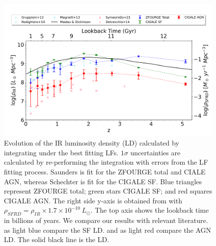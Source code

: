 \begin{figure}
    \centering
    \includegraphics[width=\textwidth]{Figures/SFRD.png}
    \caption{Evolution of the IR luminosity density (LD) calculated by integrating under the best fitting LFs. $1\sigma$ uncertainties are calculated by re-performing the integration with errors from the LF fitting process. Saunders is fit for the ZFOURGE total and CIALE AGN, whereas Schechter is fit for the CIGALE SF. Blue triangles represent ZFOURGE total; green stars CIGALE SF; and red squares CIGALE AGN. The right side y-axis is obtained from \cite{kennicutt_global_1998} with $\rho_{SFRD} = \rho_{IR} \times 1.7\times10^{-10} \ L_{\odot}$. The top axis shows the lookback time in billions of years. We compare our results with relevant literature. \cite{gruppioni_herschel_2013, rodighiero_mid-_2010, magnelli_deepest_2013} as light blue compare the SF LD. \cite{symeonidis_agn_2021} and \cite{delvecchio_tracing_2014} as light red compare the AGN LD. The solid black line is the \cite{madau_cosmic_2014} LD.}
    \label{Fig: SFRD}
\end{figure}

